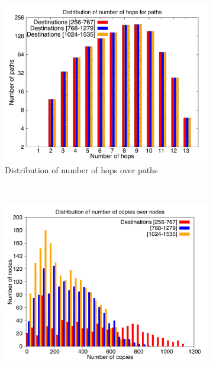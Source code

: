 \documentclass[letter]{article}
\begin{document}
\begin{figure}[!htbp]
        \centering
        \begin{subfigure}[b]{0.49\textwidth}
                \includegraphics[width=\textwidth]{report_figures/incrdist/2k/hop_histo.pdf}
                \caption{Distribution of number of hops over paths}
                \label{fig:incrdist_2k_hop}
        \end{subfigure}%
        ~ %
        \begin{subfigure}[b]{0.49\textwidth}
                \includegraphics[width=\textwidth]{report_figures/incrdist/2k/copy_histo.pdf}

\end{subfigure}
\end{figure}
\end{document}

